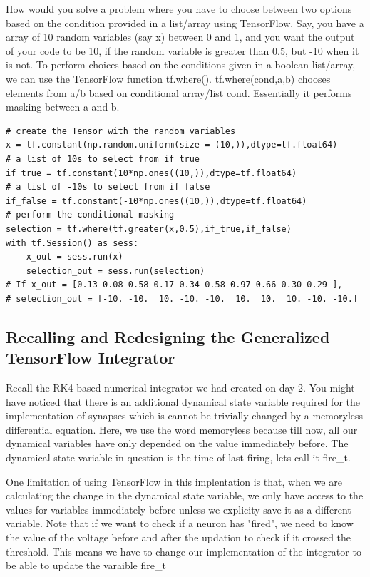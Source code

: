 \documentclass[10pt,letterpaper]{article}
\begin{document}
How would you solve a problem where you have to choose between two options based on the condition provided in a list/array using TensorFlow. Say, you have a array of 10 random variables (say x) between 0 and 1, and you want the output of your code to be 10, if the random variable is greater than 0.5, but -10 when it is not. To perform choices based on the conditions given in a boolean list/array, we can use the TensorFlow function tf.where(). tf.where(cond,a,b) chooses elements from a/b based on conditional array/list cond. Essentially it performs masking between a and b.

\begin{verbatim}
# create the Tensor with the random variables
x = tf.constant(np.random.uniform(size = (10,)),dtype=tf.float64)
# a list of 10s to select from if true
if_true = tf.constant(10*np.ones((10,)),dtype=tf.float64)
# a list of -10s to select from if false
if_false = tf.constant(-10*np.ones((10,)),dtype=tf.float64)
# perform the conditional masking
selection = tf.where(tf.greater(x,0.5),if_true,if_false)
with tf.Session() as sess:
    x_out = sess.run(x)
    selection_out = sess.run(selection)
# If x_out = [0.13 0.08 0.58 0.17 0.34 0.58 0.97 0.66 0.30 0.29 ],
# selection_out = [-10. -10.  10. -10. -10.  10.  10.  10. -10. -10.]
\end{verbatim}

\subsection*{Recalling and Redesigning the Generalized TensorFlow Integrator}
Recall the RK4 based numerical integrator we had created on day 2. You might have noticed that there is an additional dynamical state variable required for the implementation of synapses which is cannot be trivially changed by a memoryless differential equation. Here, we use the word memoryless because till now, all our dynamical variables have only depended on the value immediately before. The dynamical state variable in question is the time of last firing, lets call it fire\_t. 

One limitation of using TensorFlow in this implentation is that, when we are calculating the change in the dynamical state variable, we only have access to the values for variables immediately before unless we explicity save it as a different variable. Note that if we want to check if a neuron has "fired", we need to know the value of the voltage before and after the updation to check if it crossed the threshold. This means we have to change our implementation of the integrator to be able to update the varaible fire\_t
\end{document}
